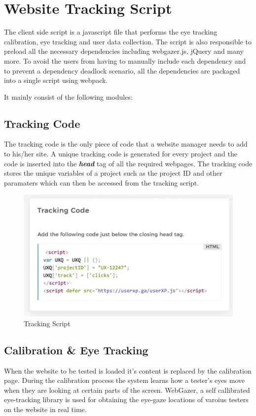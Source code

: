 \documentclass[12pt,a4paper,final]{extreport}
\begin{document}
\section{Website Tracking Script}
The client side script is a javascript file that performs the eye tracking calibration, eye tracking and user data collection. The script is also responsible to preload all the necessary dependencies including webgazer.js, jQuery and many more. To avoid the users from having to manually include each dependency and to prevent a dependency deadlock scenario, all the dependencies are packaged into a single script using webpack.

It mainly consist of the following modules:
\subsection{Tracking Code}
The tracking code is the only piece of code that a website manager needs to add to his/her site. A unique tracking code is generated for every project and the code is inserted into the \textbf{\textit{head}} tag of all the required webpages. The tracking code stores the unique variables of a project such as the project ID and other paramaters which can then be accessed from the tracking script.
\begin{figure}[H]
    \centering
    \includegraphics[width=\linewidth]{tracking-script.png}
    \caption{Tracking Script}
\end{figure}

\subsection{Calibration \& Eye Tracking}
When the website to be tested is loaded it's content is replaced by the calibration page. During the calibration process the system learns how a tester’s eyes move when they are looking at certain parts of the screen.
WebGazer, a self callibrated eye-tracking library is used for obtaining the eye-gaze locations of varoius testers on the website in real time.
\end{document}
